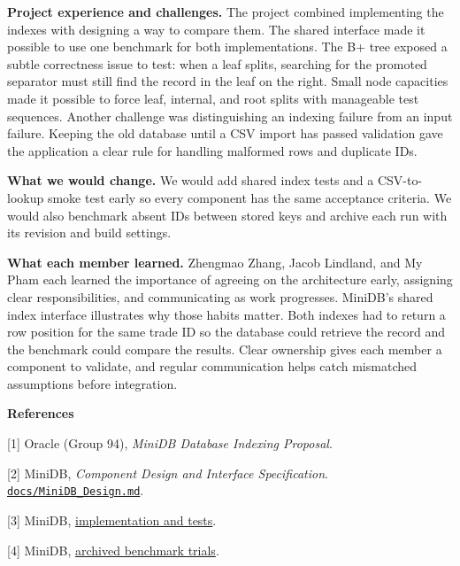 \documentclass[12pt,letterpaper]{article}
\newcommand{\heading}[1]{\par\addvspace{10pt}\noindent\textbf{#1}\par\nobreak}
\newcommand{\repo}{https://github.com/billzhengmaozhang/COP3530p2}
\begin{document}
\textbf{Project experience and challenges.}
The project combined implementing the indexes with designing a way to compare
them. The shared interface made it possible to use one benchmark for both
implementations. The B+ tree exposed a subtle correctness issue to test: when a
leaf splits, searching for the promoted separator must still find the record in
the leaf on the right. Small node capacities made it possible to force leaf,
internal, and root splits with manageable test sequences. Another challenge was
distinguishing an indexing failure from an input failure. Keeping the old
database until a CSV import has passed validation gave the application a clear
rule for handling malformed rows and duplicate IDs.

\textbf{What we would change.}
We would add shared index tests and a CSV-to-lookup smoke test early so every
component has the same acceptance criteria. We would also benchmark absent IDs
between stored keys and archive each run with its revision and build settings.

\textbf{What each member learned.}
Zhengmao Zhang, Jacob Lindland, and My Pham each learned the importance of
agreeing on the architecture early, assigning clear responsibilities, and
communicating as work progresses. MiniDB's shared index interface illustrates
why those habits matter. Both indexes had to return a row position for the same
trade ID so the database could retrieve the record and the benchmark could
compare the results. Clear ownership gives each member a component to validate,
and regular communication helps catch mismatched assumptions before integration.

\heading{References}

[1] Oracle (Group 94), \emph{MiniDB Database Indexing Proposal}.

[2] MiniDB, \emph{Component Design and Interface Specification}.
\href{\repo/blob/main/docs/MiniDB_Design.md}{\texttt{docs/MiniDB\_Design.md}}.

[3] MiniDB, \href{\repo/tree/main}{implementation and tests}.

[4] MiniDB, \href{\repo/blob/main/results/submission-benchmark.csv}{archived benchmark trials}.
\end{document}
